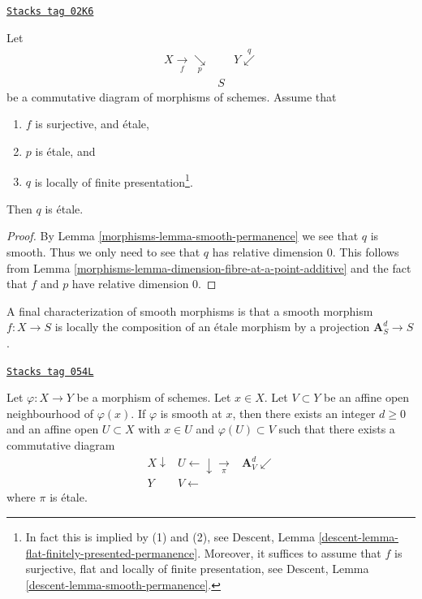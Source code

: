 \begin{lemma}
\label{morphisms-lemma-etale-permanence-two}
\href{https://stacks.math.columbia.edu/tag/02K6}{\texttt{Stacks tag 02K6}}

Let
$$
\begin{array}{ccc}X \underset{f}{\longrightarrow}\underset{p}{\searrow} &  & Y \overset{q}{\swarrow} \\  & S & \end{array}
$$
be a commutative diagram of morphisms of schemes. Assume that
\begin{enumerate}
\item $f$ is surjective, and \'etale,
\item $p$ is \'etale, and
\item $q$ is locally of finite presentation\footnote{In fact this
is implied by (1) and (2), see
Descent, Lemma \ref{descent-lemma-flat-finitely-presented-permanence}.
Moreover, it suffices to assume that $f$ is surjective, flat and
locally of finite presentation, see
Descent, Lemma \ref{descent-lemma-smooth-permanence}.}.
\end{enumerate}
Then $q$ is \'etale.
\end{lemma}

\begin{proof}

By Lemma \ref{morphisms-lemma-smooth-permanence} we see that $q$ is smooth.
Thus we only need to see that $q$ has relative dimension $0$.
This follows from Lemma \ref{morphisms-lemma-dimension-fibre-at-a-point-additive}
and the fact that $f$ and $p$ have relative dimension $0$.
\end{proof}

A final characterization of smooth morphisms is that a smooth morphism
$f : X \to S$ is locally the composition of an \'etale morphism by a projection
$\mathbf{A}_S^d \to S$.

\begin{lemma}
\label{morphisms-lemma-smooth-etale-over-affine-space}
\href{https://stacks.math.columbia.edu/tag/054L}{\texttt{Stacks tag 054L}}


Let $\varphi : X \to Y$ be a morphism of schemes. Let $x \in X$.
Let $V \subset Y$ be an affine open neighbourhood of $\varphi(x)$.
If $\varphi$ is smooth at $x$, then there exists an integer $d \geq 0$
and an affine open $U \subset X$ with $x \in U$ and
$\varphi(U) \subset V$ such that there exists a commutative diagram
$$
\begin{array}{ccc}X \downarrow & U \longleftarrow\downarrow\underset{\pi}{\longrightarrow} & \mathbf{A}^d_V \swarrow \\ Y & V \longleftarrow & \end{array}
$$
where $\pi$ is \'etale.
\end{lemma}

